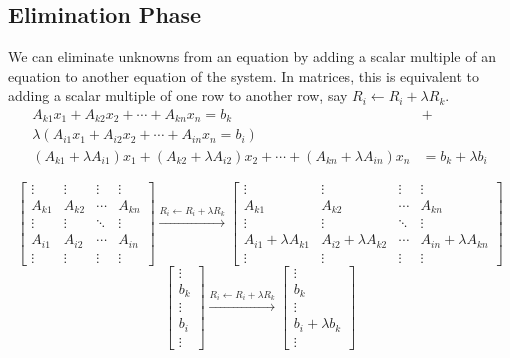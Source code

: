 \subsection{Elimination Phase}
	We can eliminate unknowns from an equation by adding a scalar multiple of an equation to another equation of the system. In matrices, this is equivalent to adding a scalar multiple of one row to another row, say $R_i \leftarrow R_i + \lambda{}R_k$.
	\begin{align*}
		A_{k1}x_1 + A_{k2}x_2 + \cdots + A_{kn}x_n = b_k  & + \\
		\lambda \left( A_{i1}x_1 + A_{i2}x_2 + \cdots + A_{in}x_n  = b_i \right) & \\ \hline
		(A_{k1}+\lambda{}A_{i1})x_1 + (A_{k2}+\lambda{}A_{i2})x_2 + \cdots + (A_{kn} + \lambda{}A_{in})x_n & = b_k + \lambda{}b_i
	\end{align*}

	\[ \begin{bmatrix} \vdots & \vdots & \vdots & \vdots \\ A_{k1} & A_{k2} & \cdots & A_{kn} \\ \vdots & \vdots & \ddots & \vdots \\ A_{i1} & A_{i2} & \cdots & A_{in} \\ \vdots & \vdots & \vdots & \vdots \end{bmatrix} \xrightarrow{R_i \leftarrow R_i + \lambda{}R_k} \begin{bmatrix} \vdots & \vdots & \vdots & \vdots \\ A_{k1} & A_{k2} & \cdots & A_{kn} \\ \vdots & \vdots & \ddots & \vdots \\ A_{i1}+\lambda{}A_{k1} & A_{i2}+\lambda{}A_{k2} & \cdots & A_{in}+\lambda{}A_{kn} \\ \vdots & \vdots & \vdots & \vdots \end{bmatrix}\]
		\[ \begin{bmatrix} \vdots \\ b_k \\ \vdots \\ b_i \\ \vdots \end{bmatrix} \xrightarrow{R_i \leftarrow R_i + \lambda{}R_k} \begin{bmatrix} \vdots \\ b_k \\ \vdots \\ b_i + \lambda{}b_k \\ \vdots \end{bmatrix} \]
			
